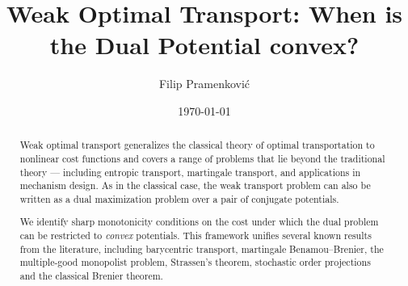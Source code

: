 \documentclass[reqno, a4paper]{amsart}
\title{Weak Optimal Transport: When is the Dual Potential convex?}
\author{Filip Pramenković}
\date{\monthyeardate\today}
\theoremstyle{definition}
\theoremstyle{definition}
\theoremstyle{definition}
\begin{document}
\begin{abstract}
 Weak optimal transport generalizes the classical theory of optimal transportation to nonlinear cost functions and covers a range of problems that lie beyond the traditional theory --- including entropic transport, martingale transport, and applications in mechanism design. As in the classical case, the weak transport problem can also be written as a dual maximization problem over a pair of conjugate potentials. 

 We identify sharp monotonicity conditions on the cost under which the dual problem can be restricted to \emph{convex} potentials. This framework unifies several known results from the literature, including barycentric transport, martingale Benamou--Brenier, the multiple-good monopolist problem, Strassen's theorem, stochastic order projections and the classical Brenier theorem. %
 
 
 







    
    
\end{abstract}
\end{document}
